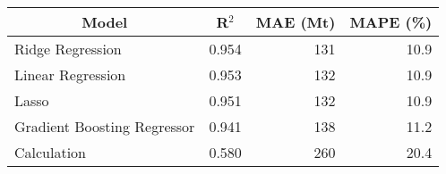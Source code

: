 
\begin{tabular}[t]{lrrr}
\toprule
\multicolumn{1}{c}{Model} & \multicolumn{1}{c}{R$^2$} & \multicolumn{1}{c}{MAE (Mt)} & \multicolumn{1}{c}{MAPE (\%)}\\
\midrule
Ridge Regression & 0.954 & 131 & 10.9\\
Linear Regression & 0.953 & 132 & 10.9\\
Lasso & 0.951 & 132 & 10.9\\
Gradient Boosting Regressor & 0.941 & 138 & 11.2\\
Calculation & 0.580 & 260 & 20.4\\
\bottomrule
\end{tabular}
